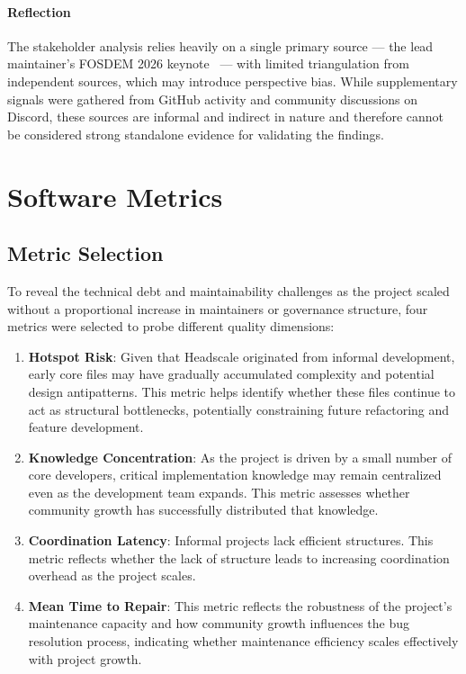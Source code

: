 \documentclass[11pt, a4paper]{article}
\begin{document}
\paragraph{Reflection}
The stakeholder analysis relies heavily on a single primary source — the lead maintainer's FOSDEM 2026 keynote~\cite{headscale_FOSDEM2026_speech} — with limited triangulation from independent sources, which may introduce perspective bias. While supplementary signals were gathered from GitHub activity and community discussions on Discord, these sources are informal and indirect in nature and therefore cannot be considered strong standalone evidence for validating the findings.

\section{Software Metrics}
\label{sec:metrics}

\subsection{Metric Selection}

To reveal the technical debt and maintainability challenges as the project scaled without a proportional increase in maintainers or governance structure, four metrics were selected to probe different quality dimensions:

\begin{enumerate}
    \item \textbf{Hotspot Risk}: Given that Headscale originated from informal development, early core files may have gradually accumulated complexity and potential design antipatterns. This metric helps identify whether these files continue to act as structural bottlenecks, potentially constraining future refactoring and feature development.
    \item \textbf{Knowledge Concentration}: As the project is driven by a small number of core developers, critical implementation knowledge may remain centralized even as the development team expands. This metric assesses whether community growth has successfully distributed that knowledge.
    \item \textbf{Coordination Latency}: Informal projects lack efficient structures. This metric reflects whether the lack of structure leads to increasing coordination overhead as the project scales.
    \item \textbf{Mean Time to Repair}: This metric reflects the robustness of the project's maintenance capacity and how community growth influences the bug resolution process, indicating whether maintenance efficiency scales effectively with project growth.
\end{enumerate}
\label{item:metrics}
\end{document}
